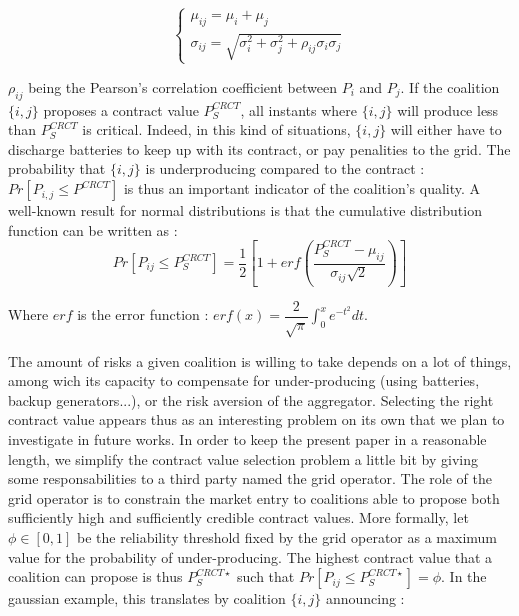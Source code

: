 \documentclass[conference]{IEEEtran}
\begin{document}
\begin{equation}
\left\{ \begin{array}{lll}
		\mu_{ij} = \mu_{i} + \mu_{j} \\
		\sigma_{ij} = \sqrt{\sigma_{i}^{2} + \sigma_{j}^{2} + \rho_{ij} \sigma_{i} \sigma_{j} }
\end{array} \right.
\end{equation}

$ \rho_{ij} $ being the Pearson's correlation coefficient between $ P_{i} $ and $ P_{j} $. If the coalition $ \{i,j\}$ proposes a contract value $ P_{S}^{CRCT} $, all instants where $ \{i,j\}$ will produce less than $ P_{S}^{CRCT} $ is critical. Indeed, in this kind of situations, $ \{i,j\}$ will either have to discharge batteries to keep up with its contract, or pay penalities to the grid. The probability that $ \{i,j\}$ is underproducing compared to the contract : $ Pr[P_{i,j} \leq P^{CRCT}] $ is thus an important indicator of the coalition's quality. A well-known result for normal distributions is that the cumulative distribution function can be written as :
\begin{equation}
Pr[P_{ij} \leq P_{S}^{CRCT}] = \dfrac{1}{2} \left[ 1+ erf \left( \dfrac{P_{S}^{CRCT} - \mu_{ij}}{\sigma_{ij}\sqrt{2}} \right) \right] 
\end{equation}
 
Where $ erf $ is the error function : $ erf(x) = \dfrac{2}{\sqrt{\pi}}\int_{0}^{x} e^{-t^{2}} dt $.

The amount of risks a given coalition is willing to take depends on a lot of things, among wich its capacity to compensate for under-producing (using batteries, backup generators...), or the risk aversion of the aggregator. Selecting the right contract value appears thus as an interesting problem on its own that we plan to investigate in future works. In order to keep the present paper in a reasonable length, we simplify the contract value selection problem a little bit by giving some responsabilities to a third party named the grid operator. The role of the grid operator is to constrain the market entry to coalitions able to propose both sufficiently high and sufficiently credible contract values. More formally, let $ \phi \in [0,1] $ be the reliability threshold fixed by the grid operator as a maximum value for the probability of under-producing. The highest contract value that a coalition can propose is thus $ P_{S}^{CRCT \star} $ such that $ Pr[P_{ij} \leq P_{S}^{CRCT \star}] = \phi $. In the gaussian example, this translates by coalition $ \{i,j\}$ announcing :
\end{document}
